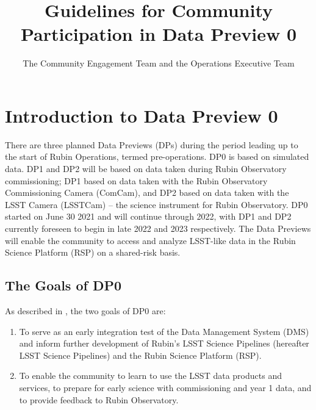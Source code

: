 \documentclass[DM,lsstdraft,authoryear,toc]{lsstdoc}
\title{Guidelines for Community Participation in Data Preview 0}
\author{The Community Engagement Team and the Operations Executive Team}
\date{\vcsDate}
\begin{document}
\maketitle

\renewcommand{\thepage}{\arabic{page}}%

\setcounter{page}{1}%


\section{Introduction to Data Preview 0}\label{sec:intro}

There are three planned Data Previews (DPs) during the period leading up to the start of Rubin Operations, termed pre-operations.
DP0 is based on simulated data.
DP1 and DP2 will be based on data taken during Rubin Observatory commissioning; DP1 based on data taken with the Rubin Observatory Commissioning Camera (ComCam), and DP2 based on data taken with the LSST Camera (LSSTCam) -- the science instrument for Rubin Observatory.
DP0 started on June 30 2021 and will continue through 2022, with DP1 and DP2 currently foreseen to begin in late 2022 and 2023 respectively.
The Data Previews will enable the community to access and analyze LSST-like data in the Rubin Science Platform (RSP) on a shared-risk basis. 

\subsection{The Goals of DP0}\label{ssec:intro_goals}

As described in , the two goals of DP0 are:
\begin{enumerate}
\item To serve as an early integration test of the Data Management System (DMS) and inform further development of Rubin's LSST Science Pipelines (hereafter LSST Science Pipelines) and the Rubin Science Platform (RSP).
\item To enable the community to learn to use the LSST data products and services, to prepare for early science with commissioning and year 1 data, and to provide feedback to Rubin Observatory. 
\end{enumerate}
\end{document}
